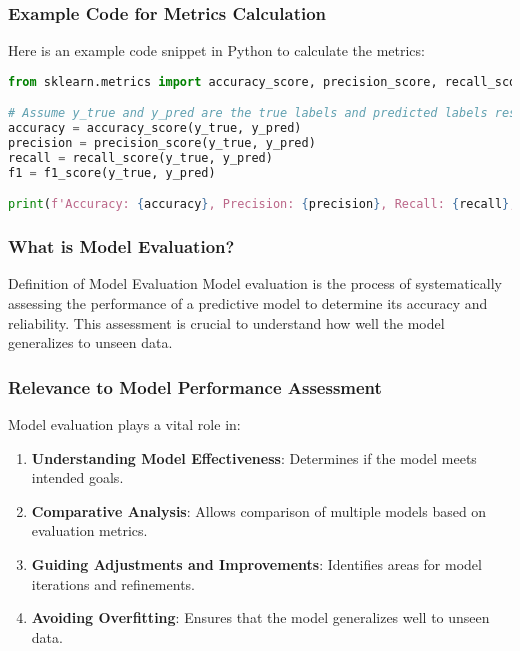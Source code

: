 \documentclass[aspectratio=169]{beamer}
\begin{document}
\begin{frame}[fragile]
    \frametitle{Example Code for Metrics Calculation}
    Here is an example code snippet in Python to calculate the metrics:
    \begin{lstlisting}[language=Python]
from sklearn.metrics import accuracy_score, precision_score, recall_score, f1_score

# Assume y_true and y_pred are the true labels and predicted labels respectively
accuracy = accuracy_score(y_true, y_pred)
precision = precision_score(y_true, y_pred)
recall = recall_score(y_true, y_pred)
f1 = f1_score(y_true, y_pred)

print(f'Accuracy: {accuracy}, Precision: {precision}, Recall: {recall}, F1 Score: {f1}')
    \end{lstlisting}
\end{frame}

\begin{frame}[fragile]
    \frametitle{What is Model Evaluation?}
    \begin{block}{Definition of Model Evaluation}
        Model evaluation is the process of systematically assessing the performance of a predictive model to determine its accuracy and reliability. This assessment is crucial to understand how well the model generalizes to unseen data.
    \end{block}
\end{frame}

\begin{frame}[fragile]
    \frametitle{Relevance to Model Performance Assessment}
    Model evaluation plays a vital role in:
    \begin{enumerate}
        \item \textbf{Understanding Model Effectiveness}: Determines if the model meets intended goals.
        \item \textbf{Comparative Analysis}: Allows comparison of multiple models based on evaluation metrics.
        \item \textbf{Guiding Adjustments and Improvements}: Identifies areas for model iterations and refinements.
        \item \textbf{Avoiding Overfitting}: Ensures that the model generalizes well to unseen data.
    \end{enumerate}
\end{frame}
\end{document}

